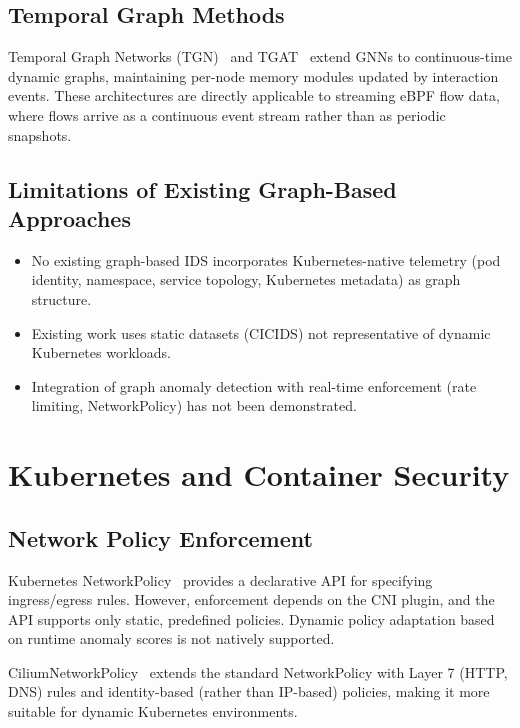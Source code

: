 \subsection{Temporal Graph Methods}

Temporal Graph Networks (TGN)~\cite{rossi2020tgn} and TGAT~\cite{xu2020tgat} extend GNNs
to continuous-time dynamic graphs, maintaining per-node memory modules updated by
interaction events. These architectures are directly applicable to streaming eBPF flow
data, where flows arrive as a continuous event stream rather than as periodic snapshots.

\subsection{Limitations of Existing Graph-Based Approaches}

\begin{itemize}
  \item No existing graph-based IDS incorporates Kubernetes-native telemetry (pod identity,
  namespace, service topology, Kubernetes metadata) as graph structure.
  \item Existing work uses static datasets (CICIDS) not representative of dynamic
  Kubernetes workloads.
  \item Integration of graph anomaly detection with real-time enforcement (rate limiting,
  NetworkPolicy) has not been demonstrated.
\end{itemize}

\section{Kubernetes and Container Security}
\label{sec:lit_k8s_security}

\subsection{Network Policy Enforcement}

Kubernetes NetworkPolicy~\cite{k8s_networkpolicy} provides a declarative API for
specifying ingress/egress rules. However, enforcement depends on the CNI plugin, and the
API supports only static, predefined policies. Dynamic policy adaptation based on runtime
anomaly scores is not natively supported.

CiliumNetworkPolicy~\cite{cilium_network_policy} extends the standard NetworkPolicy with
Layer 7 (HTTP, DNS) rules and identity-based (rather than IP-based) policies, making it
more suitable for dynamic Kubernetes environments.

